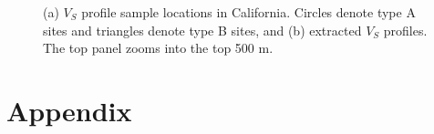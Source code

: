 \clearpage
{}
\begin{figure}[!ht]
   \hfil
  \caption{ (a) $V_S$ profile sample locations in California. Circles denote type A sites and triangles denote type B sites, and (b) extracted $V_S$ profiles. The top panel zooms into the top 500 m. }
  \label{fig:vs30-14}
\end{figure}


\setcounter{table}{0}
\setcounter{figure}{0}
\renewcommand{\thetable}{A\arabic{chapter}.\arabic{table}}
\renewcommand{\thefigure}{A\arabic{chapter}.\arabic{figure}}
\newpage
\section*{Appendix}



